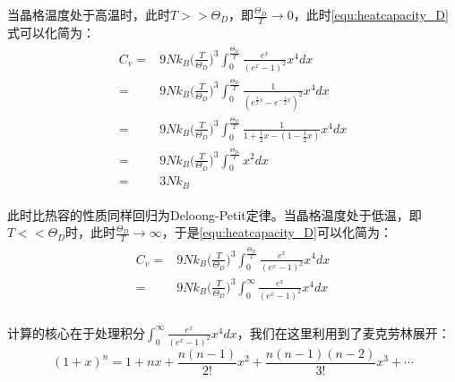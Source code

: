 \documentclass{ctexart}
\begin{document}
                当晶格温度处于高温时，此时$T>>\Theta_D$，即$\frac{\Theta_D}{T}\rightarrow 0$，此时\eqref{equ:heatcapacity_D}式可以化简为：
                \begin{align}
                    \begin{split}
                        C_v=&9Nk_B\Big(\frac{T}{\Theta_D}\Big)^3\int_0^{\frac{\Theta_D}{T}} \frac{e^{x}}{(e^{x}-1)^2}x^4dx \\
                        =&9Nk_B\Big(\frac{T}{\Theta_D}\Big)^3\int_0^{\frac{\Theta_D}{T}} \frac{1}{(e^{\frac{1}{2}x}-e^{-\frac{1}{2}x})^2}x^4dx\\
                        =&9Nk_B\Big(\frac{T}{\Theta_D}\Big)^3\int_0^{\frac{\Theta_D}{T}} \frac{1}{1+\frac{1}{2}x-(1-\frac{1}{2}x)}x^4dx\\
                        =&9Nk_B\Big(\frac{T}{\Theta_D}\Big)^3\int_0^{\frac{\Theta_D}{T}} x^2 dx\\
                        =&3Nk_B
                    \end{split}
                \end{align}
                
                此时比热容的性质同样回归为Deloong-Petit定律。当晶格温度处于低温，即$T<<\Theta_D$时，此时$\frac{\Theta_D}{T}\rightarrow \infty$，于是\eqref{equ:heatcapacity_D}可以化简为：
                \begin{align}
                    \begin{split}
                        C_v=&9Nk_B\Big(\frac{T}{\Theta_D}\Big)^3\int_0^{\frac{\Theta_D}{T}} \frac{e^{x}}{(e^{x}-1)^2}x^4dx \\
                        =&9Nk_B\Big(\frac{T}{\Theta_D}\Big)^3\int_0^\infty \frac{e^{x}}{(e^{x}-1)^2}x^4dx \\
                    \end{split}
                \end{align}
                
                计算的核心在于处理积分$\int_0^\infty \frac{e^{x}}{(e^{x}-1)^2}x^4dx$，我们在这里利用到了麦克劳林展开：
                \begin{equation}
                    (1+x)^n=1+nx+\frac{n(n-1)}{2!}x^2+\frac{n(n-1)(n-2)}{3!}x^3+\cdots
                \end{equation}
                
\end{document}
